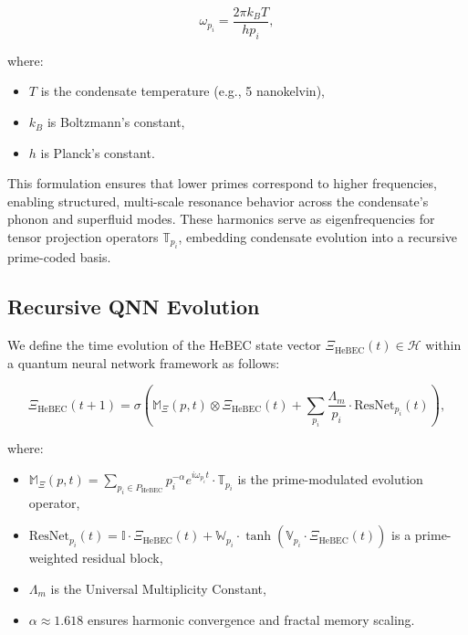 \documentclass{article}
\theoremstyle{plain}
\begin{document}
\begin{equation}
\omega_{p_i} = \frac{2 \pi k_B T}{h p_i},
\end{equation}

where:
\begin{itemize}
    \item \( T \) is the condensate temperature (e.g., 5 nanokelvin),
    \item \( k_B \) is Boltzmann’s constant,
    \item \( h \) is Planck’s constant.
\end{itemize}

This formulation ensures that lower primes correspond to higher frequencies, enabling structured, multi-scale resonance behavior across the condensate's phonon and superfluid modes. These harmonics serve as eigenfrequencies for tensor projection operators \(\mathbb{T}_{p_i}\), embedding condensate evolution into a recursive prime-coded basis.

\subsection{Recursive QNN Evolution}

We define the time evolution of the HeBEC state vector \( \Xi_{\text{HeBEC}}(t) \in \mathcal{H} \) within a quantum neural network framework as follows:

\begin{equation}
\Xi_{\text{HeBEC}}(t+1) = \sigma\left( \mathbb{M}_\Xi(p, t) \otimes \Xi_{\text{HeBEC}}(t) + \sum_{p_i} \frac{\Lambda_m}{p_i} \cdot \text{ResNet}_{p_i}(t) \right),
\end{equation}

where:
\begin{itemize}
    \item \( \mathbb{M}_\Xi(p, t) = \sum_{p_i \in P_{\text{HeBEC}}} p_i^{-\alpha} e^{i \omega_{p_i} t} \cdot \mathbb{T}_{p_i} \) is the prime-modulated evolution operator,
    \item \( \text{ResNet}_{p_i}(t) = \mathbb{I} \cdot \Xi_{\text{HeBEC}}(t) + \mathbb{W}_{p_i} \cdot \tanh(\mathbb{V}_{p_i} \cdot \Xi_{\text{HeBEC}}(t)) \) is a prime-weighted residual block,
    \item \( \Lambda_m \) is the Universal Multiplicity Constant,
    \item \( \alpha \approx 1.618 \) ensures harmonic convergence and fractal memory scaling.
\end{itemize}
\end{document}
